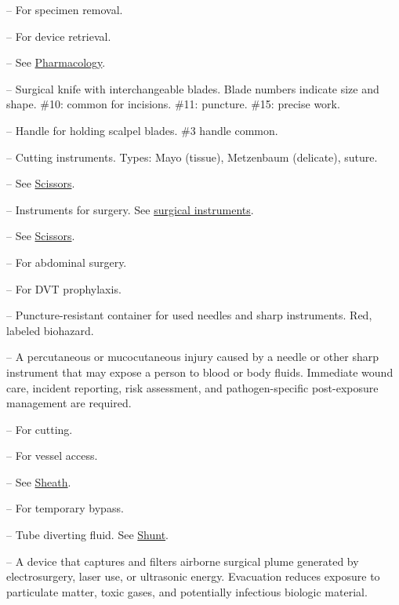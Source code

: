 -- For specimen removal.

-- For device retrieval.


-- See \hyperlink{Pharmacology}{Pharmacology}.

-- Surgical knife with interchangeable blades. Blade numbers indicate size and shape. \#10: common for incisions. \#11: puncture. \#15: precise work.

-- Handle for holding scalpel blades. \#3 handle common.

-- Cutting instruments. Types: Mayo (tissue), Metzenbaum (delicate), suture.

-- See \hyperlink{Scissors}{Scissors}.

-- Instruments for surgery. See \hyperlink{Surgical Instruments}{surgical instruments}.

-- See \hyperlink{Scissors}{Scissors}.


-- For abdominal surgery.

-- For DVT prophylaxis.

-- Puncture-resistant container for used needles and sharp instruments. Red, labeled biohazard.

-- A percutaneous or mucocutaneous injury caused by a needle or other sharp instrument that may expose a person to blood or body fluids. Immediate wound care, incident reporting, risk assessment, and pathogen-specific post-exposure management are required.

-- For cutting.

-- For vessel access.

-- See \hyperlink{Sheath}{Sheath}.

-- For temporary bypass.

-- Tube diverting fluid. See \hyperlink{Shunt}{Shunt}.

-- A device that captures and filters airborne surgical plume generated by electrosurgery, laser use, or ultrasonic energy. Evacuation reduces exposure to particulate matter, toxic gases, and potentially infectious biologic material.

